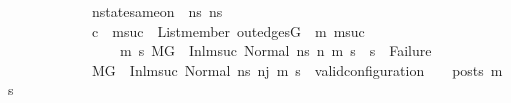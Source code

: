 \begin{isabellebody}
\ \ \ \ \ \ \ \ \ \ \ \ nstate{\isacharunderscore}{\kern0pt}same{\isacharunderscore}{\kern0pt}on\ {\isasymLambda}\ ns{}{\isacharprime}{\kern0pt}{\isacharprime}{\kern0pt}\ ns{}{\isacharprime}{\kern0pt}{\isacharprime}{\kern0pt}\ {\isacharbraceleft}{\kern0pt}{\isacharbraceright}{\kern0pt}\ {\isasymLongrightarrow}\isanewline
\ \ \ \ \ \ \ \ \ \ \ \ {\isacharparenleft}{\kern0pt}{\isasymnot}c\ {\isasymlongrightarrow}\ {\isacharparenleft}{\kern0pt}{\isasymforall}msuc{}{\isachardot}{\kern0pt}\ \ List{\isachardot}{\kern0pt}member\ {\isacharparenleft}{\kern0pt}out{\isacharunderscore}{\kern0pt}edges{\isacharparenleft}{\kern0pt}G{}{\isacharparenright}{\kern0pt}\ {\isacharbang}{\kern0pt}\ m{}{\isacharparenright}{\kern0pt}\ msuc{}\ {\isasymlongrightarrow}\isanewline
\ \ \ \ \ \ \ \ \ \ \ \ \ \ \ \ {\isacharparenleft}{\kern0pt}{\isasymforall}m{}\ s{}{\isachardot}{\kern0pt}\ {\isacharparenleft}{\kern0pt}{\isacharparenleft}{\kern0pt}M{\isacharcomma}{\kern0pt}{\isasymLambda}{\isacharcomma}{\kern0pt}{\isasymGamma}{\isacharcomma}{\kern0pt}{\isasymOmega}{\isacharcomma}{\kern0pt}G{}\ {\isasymturnstile}\ {\isacharparenleft}{\kern0pt}Inl{\isacharparenleft}{\kern0pt}msuc{}{\isacharparenright}{\kern0pt}{\isacharcomma}{\kern0pt}\ Normal\ ns{}{\isacharprime}{\kern0pt}{\isacharprime}{\kern0pt}{\isacharparenright}{\kern0pt}\ {\isacharminus}{\kern0pt}n{\isasymrightarrow}{\isacharasterisk}{\kern0pt}\ {\isacharparenleft}{\kern0pt}m{}{\isacharcomma}{\kern0pt}\ s{}{\isacharparenright}{\kern0pt}{\isacharparenright}{\kern0pt}\ {\isasymlongrightarrow}\ s{}\ {\isasymnoteq}\ Failure{\isacharparenright}{\kern0pt}{\isacharparenright}{\kern0pt}{\isacharparenright}{\kern0pt}{\isacharparenright}{\kern0pt}\ {\isasymLongrightarrow}\isanewline
\ \ \ \ \ \ \ \ \ \ \ \ M{\isacharcomma}{\kern0pt}{\isasymLambda}{\isacharcomma}{\kern0pt}{\isasymGamma}{\isacharcomma}{\kern0pt}{\isasymOmega}{\isacharcomma}{\kern0pt}G{}\ {\isasymturnstile}\ {\isacharparenleft}{\kern0pt}Inl{\isacharparenleft}{\kern0pt}msuc{\isacharparenright}{\kern0pt}{\isacharcomma}{\kern0pt}\ Normal\ ns{}{\isacharprime}{\kern0pt}{\isacharprime}{\kern0pt}{\isacharparenright}{\kern0pt}\ {\isacharminus}{\kern0pt}n{\isasymrightarrow}{\isacharcircum}{\kern0pt}j{\isacharprime}{\kern0pt}\ {\isacharparenleft}{\kern0pt}m{\isacharprime}{\kern0pt}{\isacharcomma}{\kern0pt}\ s{\isacharprime}{\kern0pt}{\isacharparenright}{\kern0pt}\ {\isasymLongrightarrow}\ valid{\isacharunderscore}{\kern0pt}configuration\ {\isasymLambda}\ {\isasymGamma}\ {\isasymOmega}\ posts\ m{\isacharprime}{\kern0pt}\ s{\isacharprime}{\kern0pt}{\isachardoublequoteclose}\isanewline

\end{isabellebody}
